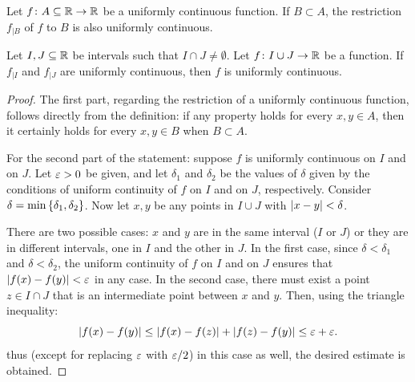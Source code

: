 \begin{theorem}
Let $f\colon A \subseteq {\mathbb R} \to {\mathbb R}$ be a uniformly continuous function. If
$B\subset A$, the restriction $f_{|B}$ of $f$ to $B$ is also uniformly
continuous.

Let $I,J\subseteq {\mathbb R}$ be intervals such that $I\cap J \neq \emptyset$.
Let $f\colon I \cup J \to {\mathbb R}$ be a function. If $f_{|I}$ and $f_{|J}$ are
uniformly continuous, then $f$ is uniformly continuous.
\end{theorem}
\begin{proof}
The first part, regarding the restriction of a uniformly continuous function,
follows directly from the definition: if any property holds for every $x,y\in
A$, then it certainly holds for every $x,y\in B$ when $B\subset A$.

For the second part of the statement: suppose $f$ is uniformly continuous on $I$
and on $J$.
Let $\varepsilon>0$ be given, and let $\delta_1$ and $\delta_2$ be the values of
$\delta$ given by the conditions of uniform continuity of $f$ on $I$ and on $J$,
respectively. Consider $\delta = \min{\left\{ \delta_1, \delta_2 \right\}}$.
Now let $x,y$ be any points in $I\cup J$ with ${\left|x-y\right|}< \delta$.

There are two possible cases:
$x$ and $y$ are in the same interval ($I$ or $J$) or they are in different
intervals, one in $I$ and the other in $J$.
In the first case, since $\delta < \delta_1$ and $\delta< \delta_2$, the uniform
continuity of $f$ on $I$ and on $J$ ensures that ${\left|f(x)-f(y)\right|} < \varepsilon$ in any
case. In the second case, there must exist a point $z \in I\cap J$ that is an
intermediate point between $x$ and $y$.
Then, using the triangle inequality:
\[
  {\left|f(x) - f(y)\right|} \le {\left|f(x) - f(z)\right|} + {\left|f(z) - f(y)\right|}
     \le \varepsilon + \varepsilon.
\]
thus (except for replacing $\varepsilon$ with $\varepsilon/2$) in this case as well, the
desired estimate is obtained.
\end{proof}


